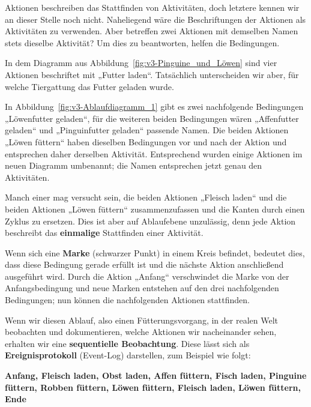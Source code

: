 
Aktionen beschreiben das Stattfinden von Aktivitäten, doch letztere kennen wir an dieser Stelle noch nicht. Naheliegend wäre die Beschriftungen der Aktionen als Aktivitäten zu verwenden. Aber betreffen zwei Aktionen mit demselben Namen stets dieselbe Aktivität? Um dies zu beantworten, helfen die Bedingungen.

In dem Diagramm aus Abbildung~\ref{fig:v3-Pinguine_und_Löwen} sind vier Aktionen beschriftet mit „Futter laden“. Tatsächlich unterscheiden wir aber, für welche Tiergattung das Futter geladen wurde. 

\pagebreak

In Abbildung~\ref{fig:v3-Ablaufdiagramm_1} gibt es zwei nachfolgende Bedingungen „Löwenfutter geladen“, 
für die weiteren beiden Bedingungen wären „Affenfutter geladen“ und „Pinguinfutter geladen“ passende Namen. Die beiden Aktionen „Löwen füttern“ haben dieselben Bedingungen vor und nach der Aktion und entsprechen daher derselben Aktivität. Entsprechend wurden einige Aktionen im neuen Diagramm umbenannt; die Namen entsprechen jetzt genau den Aktivitäten.

Manch einer mag versucht sein, die beiden Aktionen „Fleisch laden“ und die beiden Aktionen „Löwen füttern“ zusammenzufassen und die Kanten durch einen Zyklus zu ersetzen. Dies ist aber auf Ablaufebene unzulässig, denn jede Aktion beschreibt das \textbf{einmalige} Stattfinden einer Aktivität.



Wenn sich eine \textbf{Marke} (schwarzer Punkt) in einem Kreis befindet, bedeutet dies, dass diese Bedingung gerade erfüllt ist und die nächste Aktion anschließend ausgeführt wird. Durch die Aktion „Anfang“ verschwindet die Marke von der Anfangs\-bedingung und neue Marken entstehen auf den drei nachfolgenden Bedingungen; nun können die nachfolgenden Aktionen stattfinden.



Wenn wir diesen Ablauf, also einen Fütterungsvorgang, in der realen Welt beobachten und dokumentieren, welche Aktionen wir nacheinander sehen, erhalten wir eine \textbf{sequentielle Beobachtung}. Diese lässt sich als \textbf{Ereignisprotokoll} (Event-Log) darstellen, zum Beispiel wie folgt:

\textbf{Anfang, Fleisch laden, Obst laden, Affen füttern, Fisch laden, Pinguine füttern, Robben füttern, Löwen füttern, Fleisch laden, Löwen füttern, Ende}

